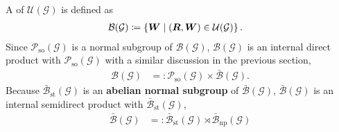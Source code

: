 A  of $\mathcal{U}(\mathcal{G})$ is defined as
\begin{align}
  \mathcal{B}(\mathcal{G})
    &\coloneqq \left\{  \bm{W}  \mathrel{}\middle|\mathrel{}  (\bm{R}, \bm{W}) \in \mathcal{U}(\mathcal{G})  \right\}.
\end{align}
Since $\mathcal{P}_{\mathrm{so}}(\mathcal{G})$ is a normal subgroup of $\mathcal{B}(\mathcal{G})$, $\mathcal{B}(\mathcal{G})$ is an internal direct product with $\mathcal{P}_{\mathrm{so}}(\mathcal{G})$ with a similar discussion in the previous section,
\begin{align}
  \mathcal{B}(\mathcal{G})
    &=: \mathcal{P}_{\mathrm{so}}(\mathcal{G}) \times \bar{\mathcal{B}}(\mathcal{G}).
\end{align}
Because $\bar{\mathcal{B}}_{\mathrm{st}}(\mathcal{G})$ is an \textbf{abelian normal subgroup} of $\bar{\mathcal{B}}(\mathcal{G})$, $\bar{\mathcal{B}}(\mathcal{G})$ is an internal semidirect product with $\bar{\mathcal{B}}_{\mathrm{st}}(\mathcal{G})$,
\begin{align}
    \bar{\mathcal{B}}(\mathcal{G})
        &=: \bar{\mathcal{B}}_{\mathrm{st}}(\mathcal{G}) \rtimes \bar{\mathcal{B}}_{\mathrm{np}}(\mathcal{G})
\end{align}
